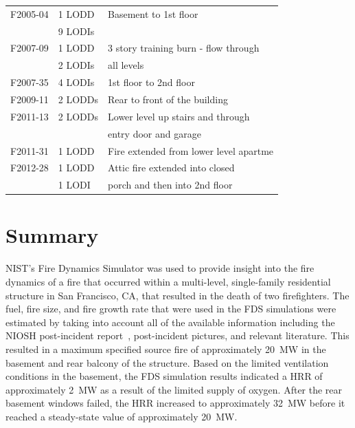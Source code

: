 \documentclass[12pt,oneside]{book}
\begin{document}
\begin{table}[!ht]
\begin{tabular}{lll}
F2005-04 \cite{NIOSH:McFall4}       &  1 LODD             &  Basement to 1st floor                   \\
                                    &  9 LODIs            &                                          \\
F2007-09 \cite{NIOSH:Tarley}        &  1 LODD             &  3 story training burn - flow through    \\
                                    &  2 LODIs            &  all levels                              \\
F2007-35 \cite{NIOSH:Braddee}       &  4 LODIs            &  1st floor to 2nd floor                  \\
F2009-11 \cite{NIOSH:Merinar}       &  2 LODDs            &  Rear to front of the building           \\
F2011-13 \cite{NIOSH:Bowyer2}       &  2 LODDs            &  Lower level up stairs and through       \\
                                    &                     &  entry door and garage                   \\
F2011-31 \cite{NIOSH:Loflin}        &  1 LODD             &  Fire extended from lower level apartme  \\
F2012-28 \cite{NIOSH:Bowyer}        &  1 LODD             &  Attic fire extended into closed         \\
                                    &  1 LODI             &  porch and then into 2nd floor           \\
\bottomrule
\end{tabular}
\label{tab:LODD}
\end{table}


\chapter{Summary}
\label{sec:summary}

NIST's Fire Dynamics Simulator was used to provide insight into the fire dynamics of a fire that occurred within a multi-level, single-family residential structure in San Francisco, CA, that resulted in the death of two firefighters. The fuel, fire size, and fire growth rate that were used in the FDS simulations were estimated by taking into account all of the available information including the NIOSH post-incident report~\cite{NIOSH:Bowyer2}, post-incident pictures, and relevant literature. This resulted in a maximum specified source fire of approximately 20~MW in the basement and rear balcony of the structure. Based on the limited ventilation conditions in the basement, the FDS simulation results indicated a HRR of approximately 2~MW as a result of the limited supply of oxygen. After the rear basement windows failed, the HRR increased to approximately 32~MW before it reached a steady-state value of approximately 20~MW.
\end{document}
